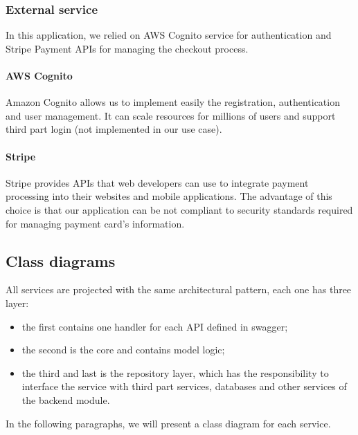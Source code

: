 \subsubsection{External service}\label{_architectureExternalServices}
In this application, we relied on AWS Cognito service for authentication and Stripe Payment APIs for managing the checkout process.
\paragraph*{AWS Cognito}
Amazon Cognito allows us to implement easily the registration, authentication and user management.
It can scale resources for millions of users and support third part login (not implemented in our use case).

\paragraph*{Stripe}
Stripe provides APIs that web developers can use to integrate payment processing into their websites and mobile applications.
The advantage of this choice is that our application can be not compliant to security standards required for managing payment card's information.

\subsection{Class diagrams}\label{_classDiagram}
All services are projected with the same architectural pattern, each one has three layer:
\begin{itemize}
    \item the first contains one handler for each API defined in swagger;
    \item the second is the core and contains model logic;
    \item the third and last is the repository layer, which has the responsibility to interface the
          service with third part services, databases and other services of the backend module.
\end{itemize}
In the following paragraphs, we will present a class diagram for each service.


